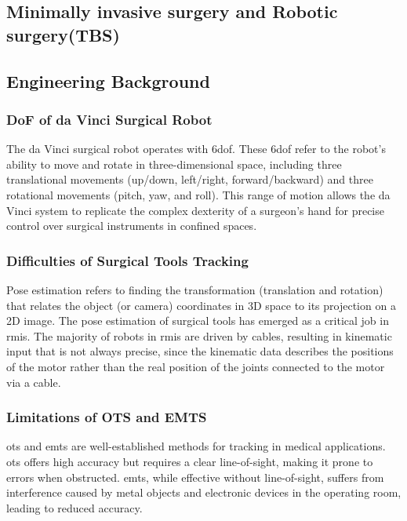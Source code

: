 \documentclass[12pt]{article}
\begin{document}
\subsection{Minimally invasive surgery and Robotic surgery(TBS)}



\subsection{Engineering Background}
\subsubsection{DoF of da Vinci Surgical Robot}
The da Vinci surgical robot operates with \gls{6dof}. These \gls{6dof} refer to the robot's ability to move and rotate in three-dimensional space, including three translational movements (up/down, left/right, forward/backward) and three rotational movements (pitch, yaw, and roll)\cite{app9030546}. This range of motion allows the da Vinci system to replicate the complex dexterity of a surgeon's hand for precise control over surgical instruments in confined spaces.

\subsubsection{Difficulties of Surgical Tools Tracking}
Pose estimation refers to finding the transformation (translation and rotation) that relates the object (or camera) coordinates in 3D space to its projection on a 2D image. The pose estimation of surgical tools has emerged as a critical job in \gls{rmis}. The majority of robots in \gls{rmis} are driven by cables, resulting in kinematic input that is not always precise, since the kinematic data describes the positions of the motor rather than the real position of the joints connected to the motor via a cable\cite{10160287}. 

\subsubsection{Limitations of OTS and EMTS}
\gls{ots} and \gls{emts} are well-established methods for tracking in medical applications. \gls{ots} offers high accuracy but requires a clear line-of-sight, making it prone to errors when obstructed. \gls{emts}, while effective without line-of-sight, suffers from interference caused by metal objects and electronic devices in the operating room, leading to reduced accuracy\cite{8822749}.
\end{document}

